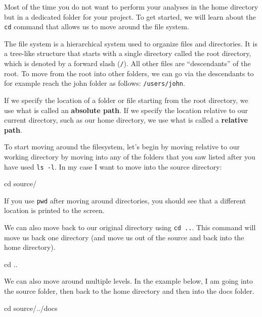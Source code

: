 \documentclass[
  letterpaper,
  DIV=11,
  numbers=noendperiod]{scrreprt}
\newenvironment{Shaded}{}{}
\newcommand{\BuiltInTok}[1]{\textcolor[rgb]{0.84,0.23,0.29}{#1}}
\newcommand{\NormalTok}[1]{\textcolor[rgb]{0.14,0.16,0.18}{#1}}
\begin{document}
Most of the time you do not want to perform your analyses in the home
directory but in a dedicated folder for your project. To get started, we
will learn about the \texttt{cd} command that allows us to move around
the file system.

The file system is a hierarchical system used to organize files and
directories. It is a tree-like structure that starts with a single
directory called the root directory, which is denoted by a forward slash
(\texttt{/}). All other files are ``descendants'' of the root. To move
from the root into other folders, we can go via the descendants to for
example reach the john folder as follows: \texttt{/users/john}.

If we specify the location of a folder or file starting from the root
directory, we use what is called an \textbf{absolute path}. If we
specify the location relative to our current directory, such as our home
directory, we use what is called a \textbf{relative path}.

To start moving around the filesystem, let's begin by moving relative to
our working directory by moving into any of the folders that you saw
listed after you have used \texttt{ls\ -l}. In my case I want to move
into the source directory:

\begin{Shaded}
\begin{Highlighting}[]
\BuiltInTok{cd}\NormalTok{ source/}
\end{Highlighting}
\end{Shaded}

If you use \texttt{pwd} after moving around directories, you should see
that a different location is printed to the screen.

We can also move back to our original directory using \texttt{cd\ ..}.
This command will move us back one directory (and move us out of the
source and back into the home directory).

\begin{Shaded}
\begin{Highlighting}[]
\BuiltInTok{cd}\NormalTok{ ..}
\end{Highlighting}
\end{Shaded}

We can also move around multiple levels. In the example below, I am
going into the source folder, then back to the home directory and then
into the docs folder.

\begin{Shaded}
\begin{Highlighting}[]
\BuiltInTok{cd}\NormalTok{ source/../docs}
\end{Highlighting}
\end{Shaded}
\end{document}
